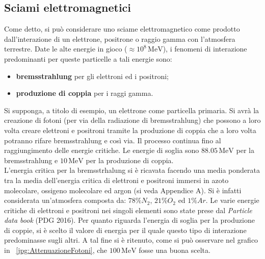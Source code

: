 \documentclass[10pt,a4paper,usenatbib]{article}
\newcommand*{\unit}[1]{\ensuremath{\mathrm{\,#1}}}                              %
\begin{document}
\subsection{Sciami elettromagnetici}
Come detto, si può considerare uno sciame elettromagnetico come prodotto dall'interazione di un elettrone, positrone o raggio gamma con l'atmosfera terrestre. Date le alte energie in gioco ($\approx10^8\unit{MeV}$), i fenomeni di interazione predominanti per queste particelle a tali energie sono:
\begin{itemize}
\item \textbf{bremsstrahlung} per gli elettroni ed i positroni;
\item \textbf{produzione di coppia} per i raggi gamma.
\end{itemize}
Si supponga, a titolo di esempio, un elettrone come particella primaria. Si avrà la creazione di fotoni (per via della radiazione di bremsstrahlung) che possono a loro volta creare elettroni e positroni tramite la produzione di coppia che a loro volta potranno rifare bremsstrahlung e così via. Il processo continua fino al raggiungimento delle energie critiche. Le energie di soglia sono $88.05\unit{MeV}$ per la bremsstrahlung e $10\unit{MeV}$ per la produzione di coppia. 
\\L'energia critica per la bremsstrhalung si è ricavata facendo una media ponderata tra la media dell'energia critica di elettroni e positroni immersi in azoto molecolare, ossigeno molecolare ed argon (si veda Appendice A). Si è infatti considerata un'atmosfera composta da: $78\% N_2$, $21\% O_2$ ed $1\% Ar$. Le varie energie critiche di elettroni e positroni nei singoli elementi sono state prese dal \textit{Particle data book} (PDG 2016). Per quanto riguarda l'energia di soglia per la produzione di coppie, si è scelto il valore di energia per il quale questo tipo di interazione predominasse sugli altri. A tal fine si è ritenuto, come si può osservare nel grafico in \figurename~\ref{jpg:AttenuazioneFotoni}, che $100\unit{MeV}$ fosse una buona scelta. 
\end{document}
